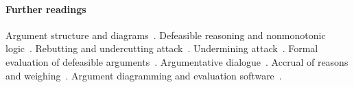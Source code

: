 \documentclass[10pt]{article}
\begin{document}
%
%
%
%
%
%

\paragraph{Further readings} 
Argument structure and diagrams~\citep{wigmore1913,wigmore1931,toulmin1958,freeman1991}. Defeasible reasoning and nonmonotonic logic~\citep{pollock1987,gabbayEtal1994}. Rebutting and undercutting attack~\citep{pollock1987,pollock1995}. Undermining attack~\citep{bondarenkoEtal1997}. Formal evaluation of defeasible arguments~\citep{pollock1987,pollock1995,dung1995,prakken2010}. Argumentative dialogue~\citep{toulmin1958,waltonKrabbe1995,prakken1997,hage2000}. Accrual of reasons and weighing~\citep{pollock1995,hage1997,verheij1996diss,prakken2005}. Argument diagramming and evaluation software~\citep{pollock1995,reedRowe2004,kirschnerEtal2003,vanGelder2003,verheij2005,gordonEtal2007}.
\end{document}
